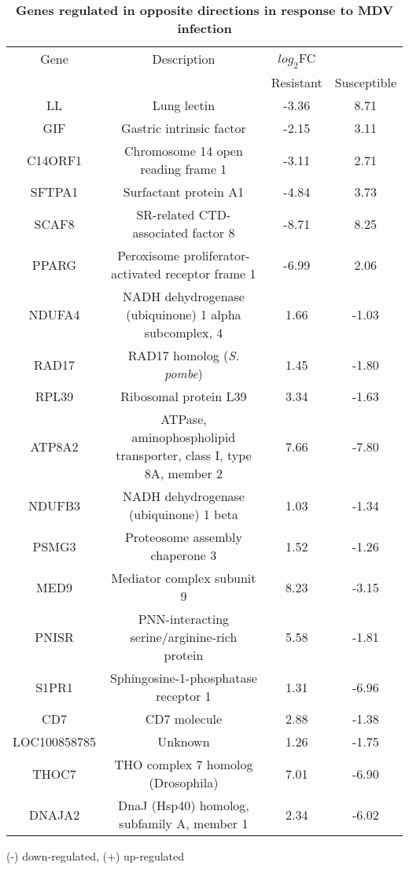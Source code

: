 \clearpage\pagestyle{lscape}
\begin{landscape}
\begin{table}
\caption{
\textbf{Genes regulated in opposite directions in response to MDV
infection}
}
\begin{center}
    \begin{tabular}{cccc}
        \hline
        Gene & Description & $log_{2}$FC & \\
         & & Resistant & Susceptible\\
        \hline
        LL & Lung lectin & -3.36 & 8.71 \\
        GIF & Gastric intrinsic factor & -2.15 & 3.11 \\
        C14ORF1 & Chromosome 14 open reading frame 1 & -3.11 & 2.71 \\
        SFTPA1 & Surfactant protein A1 & -4.84 & 3.73 \\
        SCAF8 & SR-related CTD-associated factor 8 & -8.71 & 8.25 \\
        PPARG & Peroxisome proliferator-activated receptor frame 1 & -6.99 & 2.06 \\
        \hline
        NDUFA4 & NADH dehydrogenase (ubiquinone) 1 alpha subcomplex, 4 & 1.66 & -1.03 \\
        RAD17 & RAD17 homolog ({\em S. pombe})& 1.45 & -1.80 \\
        RPL39 & Ribosomal protein L39 & 3.34 & -1.63 \\
        ATP8A2 & ATPase, aminophospholipid transporter, class I, type 8A, member 2 & 7.66 & -7.80 \\
        NDUFB3 & NADH dehydrogenase (ubiquinone) 1 beta & 1.03 & -1.34 \\
        PSMG3 & Proteosome assembly chaperone 3 & 1.52 & -1.26 \\
        MED9 & Mediator complex subunit 9 & 8.23 & -3.15 \\
        PNISR & PNN-interacting serine/arginine-rich protein & 5.58 & -1.81 \\
        S1PR1 & Sphingosine-1-phosphatase receptor 1 & 1.31 & -6.96 \\
        CD7 & CD7 molecule & 2.88 & -1.38 \\
        LOC100858785 & Unknown & 1.26 & -1.75 \\
        THOC7 & THO complex 7 homolog (Drosophila) & 7.01 & -6.90 \\
        DNAJA2 & DnaJ (Hsp40) homolog, subfamily A, member 1 & 2.34 & -6.02 \\
        \hline
    \end{tabular}
    \begin{flushleft}
        (-) down-regulated, (+) up-regulated
    \end{flushleft}
    \label{tab:opposite}
\end{center}
\end{table}
\end{landscape}
\pagestyle{plain}

